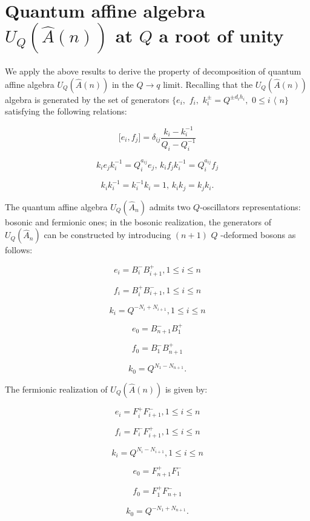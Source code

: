 \documentclass[a4paper,12pt,thmsa]{article}
\begin{document}
\section{Quantum affine algebra $U_Q(\hat A(n))$ at $Q$ a root of unity}

We apply the above results to derive the property of decomposition of
quantum affine algebra $U_Q(\hat A(n))$ in the $Q\rightarrow q$ limit.
Recalling that the $U_Q(\hat A(n))$ algebra is generated by the set of
generators $\{e_i,$ $f_i,$ $k_i^{\pm }=Q^{\pm d_ih_i},$ $0\leq i$ $\langle $
$n\}$ satisfying the following relations:

\begin{equation}
\lbrack e_i,f_j]=\delta _{ij}\frac{k_i-k_i^{-1}}{Q_i-Q_i^{-1}}
\end{equation}

\begin{equation}
k_{i}e_{j}k_{i}^{-1}=Q_{i}^{a_{ij}}e_{j},\, %
k_{i}f_{j}k_{i}^{-1}=Q_{i}^{a_{ij}}f_{j}
\end{equation}

\begin{equation}
k_ik_i^{-1}=k_i^{-1}k_i=1,\, k_ik_j=k_jk_i.
\end{equation}

The quantum affine algebra $U_Q(\hat A_n)$ admits two $Q$-oscillators
representations: bosonic and fermionic ones; in the bosonic realization, the
generators of $U_Q(\hat A_n)$ can be constructed by introducing $(n+1)$ $Q$%
-deformed bosons as follows:

\[
e_{i}=B_{i}^{-}B_{i+1}^{+},1\leq i\leq n
\]

\[
f_{i}=B_{i}^{+}B_{i+1}^{-},1\leq i\leq n
\]

\[
k_{i}=Q^{-N_{i}+N_{i+1}},1\leq i\leq n
\]

\[
e_{0}=B_{n+1}^{-}B_{1}^{+}
\]

\[
f_{0}=B_{1}^{-}B_{n+1}^{+}
\]

\[
k_0=Q^{N_1-N_{n+1}}.
\]

The fermionic realization of $U_Q(\hat A(n))$ is given by:

\[
e_i=F_i^{+}F_{i+1}^{-},1\leq i\leq n
\]

\[
f_i=F_i^{-}F_{i+1}^{+},1\leq i\leq n
\]

\[
k_i=Q^{N_i-N_{i+1}},1\leq i\leq n
\]

\[
e_0=F_{n+1}^{+}F_1^{-}
\]

\[
f_0=F_1^{+}F_{n+1}^{-}
\]

\[
k_0=Q^{-N_1+N_{n+1}}.
\]
\end{document}
